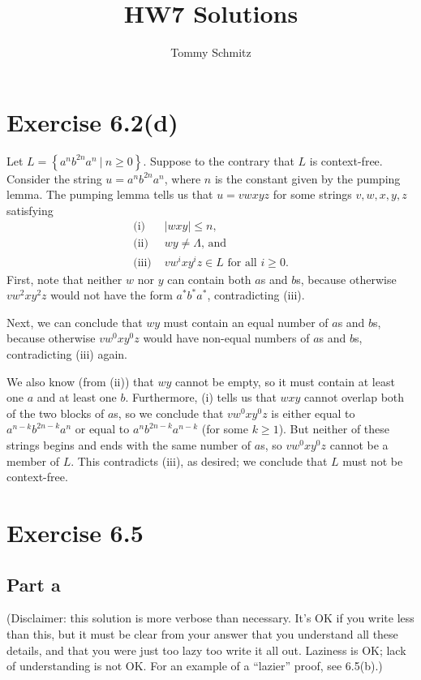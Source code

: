 \documentclass[12pt]{article}
\title{HW7 Solutions}
\author{Tommy Schmitz}
\newcommand{\set}[1]{\left\{#1\right\}}
\newcommand{\Set}[2]{\set{#1\ |\ #2}}
\begin{document}
\maketitle

\section{Exercise 6.2(d)}
  Let $L=\Set{a^nb^{2n}a^n}{n\geq0}$. Suppose to the contrary that $L$ is context-free. Consider the string $u=a^nb^{2n}a^n$, where $n$ is the constant given by the pumping lemma. The pumping lemma tells us that $u=vwxyz$ for some strings $v,w,x,y,z$ satisfying
  \begin{align*}
    \text{(i) }   &\text{$|wxy|\leq n$,} \\
    \text{(ii) }  &\text{$wy\neq\Lambda$, and} \\
    \text{(iii) } &\text{$vw^ixy^iz\in L$ for all $i\geq0$.}
  \end{align*}
  First, note that neither $w$ nor $y$ can contain both $a$s and $b$s, because otherwise $vw^2xy^2z$ would not have the form $a^*b^*a^*$, contradicting (iii).

  Next, we can conclude that $wy$ must contain an equal number of $a$s and $b$s, because otherwise $vw^0xy^0z$ would have non-equal numbers of $a$s and $b$s, contradicting (iii) again.

  We also know (from (ii)) that $wy$ cannot be empty, so it must contain at least one $a$ and at least one $b$. Furthermore, (i) tells us that $wxy$ cannot overlap both of the two blocks of $a$s, so we conclude that $vw^0xy^0z$ is either equal to $a^{n-k}b^{2n-k}a^n$ or equal to $a^nb^{2n-k}a^{n-k}$ (for some $k\geq1$). But neither of these strings begins and ends with the same number of $a$s, so $vw^0xy^0z$ cannot be a member of $L$. This contradicts (iii), as desired; we conclude that $L$ must not be context-free.
\section{Exercise 6.5}
  \subsection{Part a}
    (Disclaimer: this solution is more verbose than necessary. It's OK if you write less than this, but it must be clear from your answer that you understand all these details, and that you were just too lazy too write it all out. Laziness is OK; lack of understanding is not OK. For an example of a ``lazier'' proof, see 6.5(b).)
\end{document}
